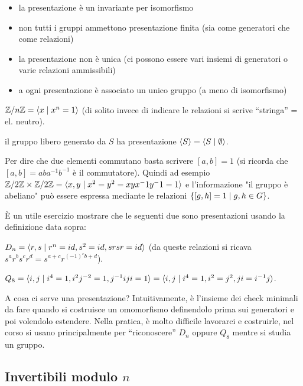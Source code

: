 \begin{itemize}
    \item la presentazione è un invariante per isomorfismo
    \item non tutti i gruppi ammettono presentazione finita (sia come generatori che come relazioni)
    \item la presentazione non è unica (ci possono essere vari insiemi di generatori o varie relazioni ammissibili)
    \item a ogni presentazione è associato un unico gruppo (a meno di isomorfismo)
    \end{itemize}
\begin{example}
    $\mathbb{Z}/n\mathbb{Z} = \langle x \mid x^n = 1 \rangle$ (di solito invece di indicare le relazioni si scrive ``stringa'' = el. neutro).
\end{example}
\begin{example}
    il gruppo libero generato da $S$ ha presentazione $\langle S \rangle = \langle S \mid \emptyset \rangle$.
\end{example}
\begin{example}
    Per dire che due elementi commutano basta scrivere $[a,b] = 1$ (si ricorda che $[a,b] = aba^{-1}b^{-1}$ è il commutatore). Quindi ad esempio $\mathbb{Z}/2\mathbb{Z} \times \mathbb{Z}/2\mathbb{Z} = \langle x,y \mid x^2 = y^2 = xyx^-1y^-1 = 1 \rangle$ e l'informazione "il gruppo è abeliano" può essere espressa mediante le relazioni $\left\{ [g,h] = 1 \mid g,h \in G \right\}$.
\end{example}
È un utile esercizio mostrare che le seguenti due sono presentazioni usando la definizione data sopra:
\begin{example}
    $D_n = \langle  r, s \mid r^n = id, s^2 = id, srsr = id  \rangle$ (da queste relazioni si ricava $s^ar^bs^cr^d = s^{a+c}r^{(-1)^cb+d}$).
\end{example}
\begin{example}
    $Q_8 = \langle i,j \mid i^4 = 1, i^2j^{-2} = 1, j^{-1}iji = 1 \rangle = \langle i,j \mid i^4 = 1, i^2 = j^2, ji = i^{-1}j \rangle$.
\end{example}
A cosa ci serve una presentazione? Intuitivamente, è l'insieme dei check minimali da fare quando si costruisce un omomorfismo definendolo prima sui generatori e poi volendolo estendere. Nella pratica, è molto difficile lavorarci e costruirle, nel corso si usano principalmente per ``riconoscere'' $D_n$ oppure $Q_8$ mentre si studia un gruppo. 


\subsection{Invertibili modulo $n$}

